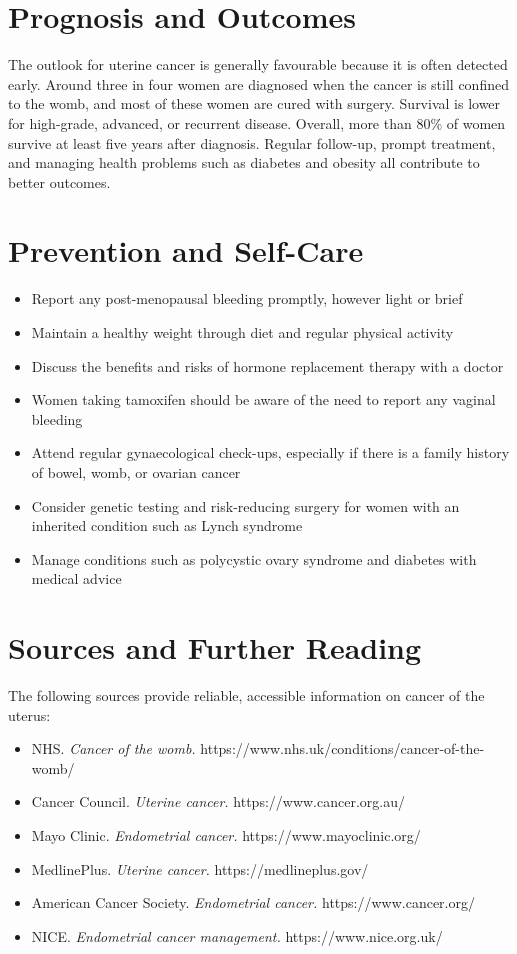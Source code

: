 \section*{Prognosis and Outcomes}
The outlook for uterine cancer is generally favourable because it is often detected early. Around three in four women are diagnosed when the cancer is still confined to the womb, and most of these women are cured with surgery. Survival is lower for high-grade, advanced, or recurrent disease. Overall, more than 80\% of women survive at least five years after diagnosis. Regular follow-up, prompt treatment, and managing health problems such as diabetes and obesity all contribute to better outcomes.

\section*{Prevention and Self-Care}
\begin{itemize}
    \item Report any post-menopausal bleeding promptly, however light or brief
    \item Maintain a healthy weight through diet and regular physical activity
    \item Discuss the benefits and risks of hormone replacement therapy with a doctor
    \item Women taking tamoxifen should be aware of the need to report any vaginal bleeding
    \item Attend regular gynaecological check-ups, especially if there is a family history of bowel, womb, or ovarian cancer
    \item Consider genetic testing and risk-reducing surgery for women with an inherited condition such as Lynch syndrome
    \item Manage conditions such as polycystic ovary syndrome and diabetes with medical advice
\end{itemize}

\section*{Sources and Further Reading}
The following sources provide reliable, accessible information on cancer of the uterus:
\begin{itemize}
    \item NHS. \textit{Cancer of the womb.} https://www.nhs.uk/conditions/cancer-of-the-womb/
    \item Cancer Council. \textit{Uterine cancer.} https://www.cancer.org.au/
    \item Mayo Clinic. \textit{Endometrial cancer.} https://www.mayoclinic.org/
    \item MedlinePlus. \textit{Uterine cancer.} https://medlineplus.gov/
    \item American Cancer Society. \textit{Endometrial cancer.} https://www.cancer.org/
    \item NICE. \textit{Endometrial cancer management.} https://www.nice.org.uk/
\end{itemize}
